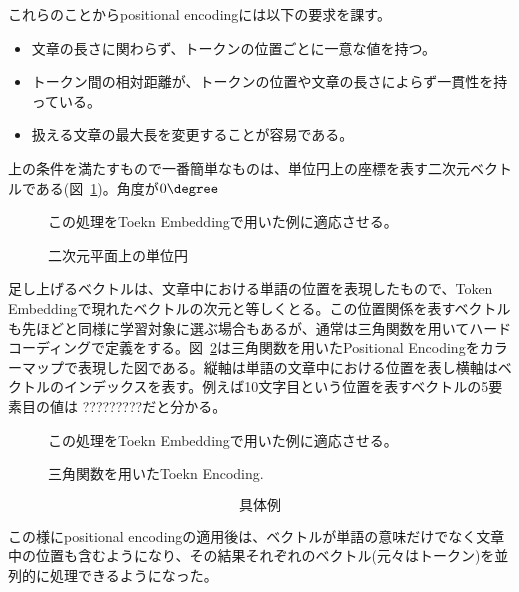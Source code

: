 これらのことからpositional encodingには以下の要求を課す。
\begin{itemize}
  \item 文章の長さに関わらず、トークンの位置ごとに一意な値を持つ。
  \item トークン間の相対距離が、トークンの位置や文章の長さによらず一貫性を持っている。
  \item 扱える文章の最大長を変更することが容易である。
\end{itemize}

上の条件を満たすもので一番簡単なものは、単位円上の座標を表す二次元ベクトルである(図~\ref{fig:pos-encoding-circle})。角度が$0\degree$

\begin{figure}
  \centering

  \caption{二次元平面上の単位円}
\label{fig:pos-encoding-circle}

この処理をToekn Embeddingで用いた例に適応させる。
\end{figure}


足し上げるベクトルは、文章中における単語の位置を表現したもので、Token Embeddingで現れたベクトルの次元と等しくとる。この位置関係を表すベクトルも先ほどと同様に学習対象に選ぶ場合もあるが、通常は三角関数を用いてハードコーディングで定義をする。図~\ref{fig:tri-pos-encoding}は三角関数を用いたPositional Encodingをカラーマップで表現した図である。縦軸は単語の文章中における位置を表し横軸はベクトルのインデックスを表す。例えば10文字目という位置を表すベクトルの5要素目の値は ?????????だと分かる。
\begin{figure}
  \centering

  \caption{三角関数を用いたToekn Encoding.}
\label{fig:tri-pos-encoding}

この処理をToekn Embeddingで用いた例に適応させる。
\end{figure}

\begin{equation*}
  \text{具体例}
\end{equation*}

この様にpositional encodingの適用後は、ベクトルが単語の意味だけでなく文章中の位置も含むようになり、その結果それぞれのベクトル(元々はトークン)を並列的に処理できるようになった。


